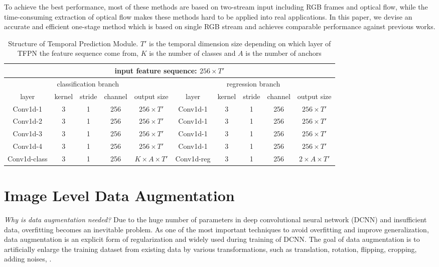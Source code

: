 \documentclass[final]{cvpr}
\begin{document}
To achieve the best performance, most of these methods are based on two-stream input including RGB frames and optical flow, while the time-consuming extraction of optical flow makes these methods hard to be applied into real applications. In this paper, we devise an accurate and efficient one-stage method which is based on single RGB stream and achieves comparable performance against previous works.

\begin{table*}[htbp]
    \caption{Structure of Temporal Prediction Module. $T'$ is the temporal dimension size depending on which layer of TFPN the feature sequence come from, $K$ is the number of classes and $A$ is the number of anchors}
    \centering
    \begin{tabular} { c | c c c | c | c | c c c | c }
        \toprule
        \multicolumn{10}{c}{input feature sequence: $ 256 \times T' $}\\
        \midrule
        \multicolumn{5}{c|}{classification branch} & \multicolumn{5}{|c}{regression branch}\\
        \midrule
        layer & kernel & stride & channel & output size & layer & kernel & stride & channel & output size \\
        \midrule
        Conv1d-1 & 3 & 1 & 256 & $ 256 \times T' $ & Conv1d-1 & 3 & 1 & 256 & $ 256 \times T' $\\
        \midrule
        Conv1d-2 & 3 & 1 & 256 & $ 256 \times T' $ & Conv1d-1 & 3 & 1 & 256 & $ 256 \times T' $\\
        \midrule
        Conv1d-3 & 3 & 1 & 256 & $ 256 \times T' $ & Conv1d-1 & 3 & 1 & 256 & $ 256 \times T' $\\
        \midrule
        Conv1d-4 & 3 & 1 & 256 & $ 256 \times T' $ & Conv1d-1 & 3 & 1 & 256 & $ 256 \times T' $\\
        \midrule
        Conv1d-class & 3 & 1 & 256 & $ K \times A \times T' $ & Conv1d-reg & 3 & 1 & 256 & $ 2 \times A \times T' $\\
        \bottomrule
    \end{tabular}
    \label{tab:TPM}
\end{table*}

\section{Image Level Data Augmentation}
\textit{Why is data augmentation needed?} Due to the huge number of parameters in deep convolutional neural network (DCNN) and insufficient data, overfitting becomes an inevitable problem. As one of the most important techniques to avoid overfitting and improve generalization, data augmentation is an explicit form of regularization and widely used during training of DCNN. The goal of data augmentation is to artificially enlarge the training dataset from existing data by various transformations, such as translation, rotation, flipping, cropping, adding noises, \etc. 
\end{document}
